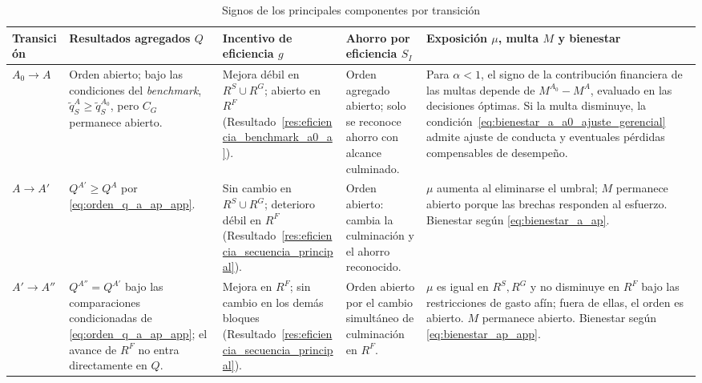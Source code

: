 \begin{table}[t]
\centering
\caption{Signos de los principales componentes por transición}
\label{tab:sintesis_resultados_esquemas}
\scriptsize
\renewcommand{\arraystretch}{1.35}
\setlength{\tabcolsep}{2.3pt}

\begin{tabularx}{\textwidth}{
@{}
>{\centering\arraybackslash}p{}
>{\raggedright\arraybackslash}p{}
>{\raggedright\arraybackslash}p{}
>{\raggedright\arraybackslash}p{}
>{\raggedright\arraybackslash}X
@{}
}
\hline

\textbf{Transición}
&
\textbf{Resultados agregados \(Q\)}
&
\textbf{Incentivo de eficiencia \(g\)}
&
\textbf{Ahorro por eficiencia \(S_I\)}
&
\textbf{Exposición \(\mu\), multa \(M\) y bienestar}
\\

\hline

\(A_0\to A\)
&
Orden abierto; bajo las condiciones del \textit{benchmark}, \(\widetilde q_S^A\geq\widetilde q_S^{A_0}\), pero \(C_G\) permanece abierto.
&
Mejora débil en \(R^S\cup R^G\); abierto en \(R^F\) (Resultado~\ref{res:eficiencia_benchmark_a0_a}).
&
Orden agregado abierto; solo se reconoce ahorro con alcance culminado.
&
Para \(\alpha<1\), el signo de la contribución financiera de las multas depende de \(M^{A_0}-M^A\), evaluado en las decisiones óptimas. Si la multa disminuye, la condición~\eqref{eq:bienestar_a_a0_ajuste_gerencial} admite ajuste de conducta y eventuales pérdidas compensables de desempeño.
\\[5pt]

\(A\to A'\)
&
\(Q^{A'}\geq Q^A\) por \eqref{eq:orden_q_a_ap_app}.
&
Sin cambio en \(R^S\cup R^G\); deterioro débil en \(R^F\) (Resultado~\ref{res:eficiencia_secuencia_principal}).
&
Orden abierto: cambia la culminación y el ahorro reconocido.
&
\(\mu\) aumenta al eliminarse el umbral; \(M\) permanece abierto porque las brechas responden al esfuerzo. Bienestar según \eqref{eq:bienestar_a_ap}.
\\[5pt]

\(A'\to A''\)
&
\(Q^{A''}=Q^{A'}\) bajo las comparaciones condicionadas de \eqref{eq:orden_q_a_ap_app}; el avance de \(R^F\) no entra directamente en \(Q\).
&
Mejora en \(R^F\); sin cambio en los demás bloques (Resultado~\ref{res:eficiencia_secuencia_principal}).
&
Orden abierto por el cambio simultáneo de culminación en \(R^F\).
&
\(\mu\) es igual en \(R^S,R^G\) y no disminuye en \(R^F\) bajo las restricciones de gasto afín; fuera de ellas, el orden es abierto. \(M\) permanece abierto. Bienestar según \eqref{eq:bienestar_ap_app}.
\\[5pt]


\end{tabularx}
\end{table}
